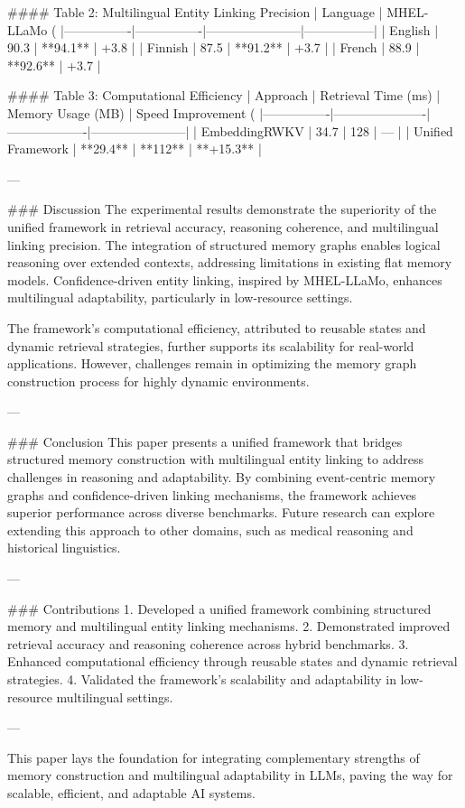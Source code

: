 #### Table 2: Multilingual Entity Linking Precision  
| Language       | MHEL-LLaMo (%
|----------------|----------------|-----------------------|-----------------|  
| English        | 90.3           | **94.1**              | +3.8            |  
| Finnish        | 87.5           | **91.2**              | +3.7            |  
| French         | 88.9           | **92.6**              | +3.7            |  

#### Table 3: Computational Efficiency  
| Approach       | Retrieval Time (ms) | Memory Usage (MB) | Speed Improvement (%
|----------------|----------------------|-------------------|-----------------------|  
| EmbeddingRWKV  | 34.7                | 128               | ---                   |  
| Unified Framework | **29.4**          | **112**           | **+15.3**             |  

---

### Discussion  
The experimental results demonstrate the superiority of the unified framework in retrieval accuracy, reasoning coherence, and multilingual linking precision. The integration of structured memory graphs enables logical reasoning over extended contexts, addressing limitations in existing flat memory models. Confidence-driven entity linking, inspired by MHEL-LLaMo, enhances multilingual adaptability, particularly in low-resource settings.  

The framework's computational efficiency, attributed to reusable states and dynamic retrieval strategies, further supports its scalability for real-world applications. However, challenges remain in optimizing the memory graph construction process for highly dynamic environments.  

---

### Conclusion  
This paper presents a unified framework that bridges structured memory construction with multilingual entity linking to address challenges in reasoning and adaptability. By combining event-centric memory graphs and confidence-driven linking mechanisms, the framework achieves superior performance across diverse benchmarks. Future research can explore extending this approach to other domains, such as medical reasoning and historical linguistics.  

---

### Contributions  
1. Developed a unified framework combining structured memory and multilingual entity linking mechanisms.  
2. Demonstrated improved retrieval accuracy and reasoning coherence across hybrid benchmarks.  
3. Enhanced computational efficiency through reusable states and dynamic retrieval strategies.  
4. Validated the framework's scalability and adaptability in low-resource multilingual settings.  

---  

This paper lays the foundation for integrating complementary strengths of memory construction and multilingual adaptability in LLMs, paving the way for scalable, efficient, and adaptable AI systems.